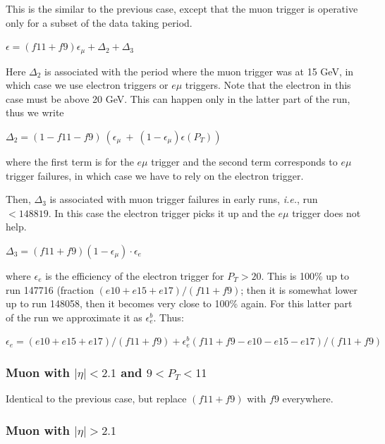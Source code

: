 This is the similar to the previous case, except that the muon 
trigger is operative only for a subset of the data taking period.

\begin{center}
$\epsilon = (f11+f9)\epsilon_{\mu} + \Delta_2 + \Delta_3$ 
\end{center}

Here $\Delta_2$ is associated with the period where the muon 
trigger was at 15 GeV, in which case we use electron triggers or
$e\mu$ triggers.  Note that the electron in this case must be
above 20 GeV.  This can happen only in the latter part of the run, 
thus we write
\begin{center}
$\Delta_2 = (1-f11-f9)~(\epsilon_{\mu}~+~
(1-\epsilon_{\mu})\epsilon(P_T))$
\end{center}
\noindent where the first term is for the $e\mu$ trigger and the 
second term corresponds to $e\mu$ trigger failures, in which case we have 
to rely on the electron trigger.

Then, $\Delta_3$ is associated with muon trigger failures in early runs, 
{\em i.e.}, run $<148819$.  In this case the electron trigger picks it 
up and the $e\mu$ trigger does not help.  

\begin{center}
$\Delta_3 = (f11+f9)(1-\epsilon_{\mu}) \cdot \epsilon_e$
\end{center}

\noindent where $\epsilon_e$ is the efficiency of the electron
trigger for $P_T>20$.  This is 100\% up to run 147716 (fraction
$(e10+e15+e17)/(f11+f9)$;  then it is somewhat lower up to
run 148058, then it becomes very close to 100\% again.
For this latter part of the run we approximate it as $\epsilon_e^b$.
Thus:

\begin{center}
$\epsilon_e = (e10+e15+e17)/(f11+f9) + 
\epsilon_e^b(f11+f9-e10-e15-e17)/(f11+f9)$
\end{center}

\subsubsection{Muon with $|\eta|<2.1$ and $9<P_T<11$}

Identical to the previous case, but replace $(f11+f9)$ with $f9$ everywhere.

\subsubsection{Muon with $|\eta|>2.1$}

